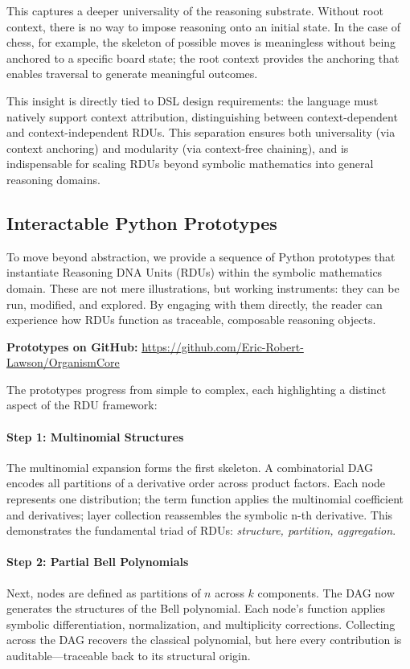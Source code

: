 \documentclass[12pt]{article}
\begin{document}
This captures a deeper universality of the reasoning substrate. Without root context, there is no way to impose reasoning onto an initial state. In the case of chess, for example, the skeleton of possible moves is meaningless without being anchored to a specific board state; the root context provides the anchoring that enables traversal to generate meaningful outcomes. 

This insight is directly tied to DSL design requirements: the language must natively support context attribution, distinguishing between context-dependent and context-independent RDUs. This separation ensures both universality (via context anchoring) and modularity (via context-free chaining), and is indispensable for scaling RDUs beyond symbolic mathematics into general reasoning domains.


\subsection{Interactable Python Prototypes}

To move beyond abstraction, we provide a sequence of Python prototypes that instantiate Reasoning DNA Units (RDUs) within the symbolic mathematics domain. These are not mere illustrations, but working instruments: they can be run, modified, and explored. By engaging with them directly, the reader can experience how RDUs function as traceable, composable reasoning objects.  

\textbf{Prototypes on GitHub:} \href{https://github.com/Eric-Robert-Lawson/OrganismCore}{https://github.com/Eric-Robert-Lawson/OrganismCore}

The prototypes progress from simple to complex, each highlighting a distinct aspect of the RDU framework:  

\paragraph{Step 1: Multinomial Structures}  
The multinomial expansion forms the first skeleton. A combinatorial DAG encodes all partitions of a derivative order across product factors. Each node represents one distribution; the term function applies the multinomial coefficient and derivatives; layer collection reassembles the symbolic n-th derivative. This demonstrates the fundamental triad of RDUs: \textit{structure, partition, aggregation}.  

\paragraph{Step 2: Partial Bell Polynomials}  
Next, nodes are defined as partitions of \(n\) across \(k\) components. The DAG now generates the structures of the Bell polynomial. Each node’s function applies symbolic differentiation, normalization, and multiplicity corrections. Collecting across the DAG recovers the classical polynomial, but here every contribution is auditable—traceable back to its structural origin.  
\end{document}
